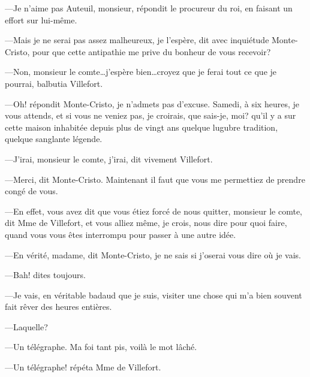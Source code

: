 —Je n'aime pas Auteuil, monsieur, répondit le procureur du roi, en faisant un effort sur lui-même. 

—Mais je ne serai pas assez malheureux, je l'espère, dit avec inquiétude Monte-Cristo, pour que cette antipathie me prive du bonheur de vous recevoir? 

—Non, monsieur le comte\dots j'espère bien\dots croyez que je ferai tout ce que je pourrai, balbutia Villefort. 

—Oh! répondit Monte-Cristo, je n'admets pas d'excuse. Samedi, à six heures, je vous attends, et si vous ne veniez pas, je croirais, que sais-je, moi? qu'il y a sur cette maison inhabitée depuis plus de vingt ans quelque lugubre tradition, quelque sanglante légende. 

—J'irai, monsieur le comte, j'irai, dit vivement Villefort. 

—Merci, dit Monte-Cristo. Maintenant il faut que vous me permettiez de prendre congé de vous. 

—En effet, vous avez dit que vous étiez forcé de nous quitter, monsieur le comte, dit Mme de Villefort, et vous alliez même, je crois, nous dire pour quoi faire, quand vous vous êtes interrompu pour passer à une autre idée. 

—En vérité, madame, dit Monte-Cristo, je ne sais si j'oserai vous dire où je vais. 

—Bah! dites toujours. 

—Je vais, en véritable badaud que je suis, visiter une chose qui m'a bien souvent fait rêver des heures entières. 

—Laquelle? 

—Un télégraphe. Ma foi tant pis, voilà le mot lâché. 

—Un télégraphe! répéta Mme de Villefort. 

